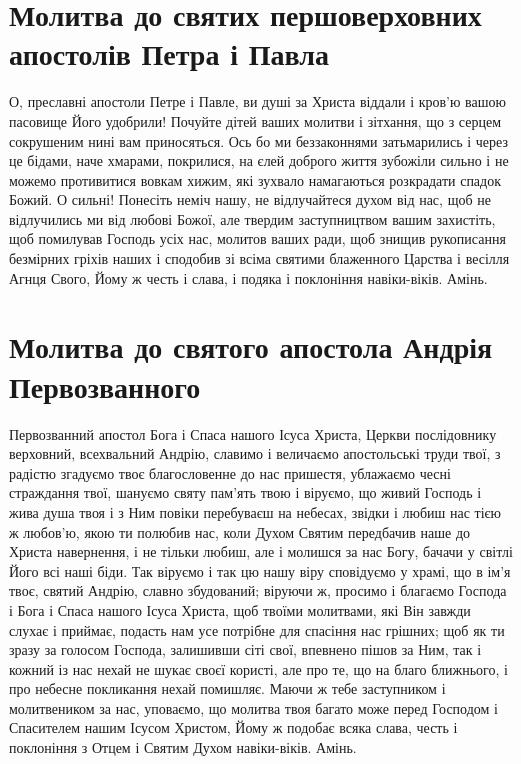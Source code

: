 \documentclass[chapters.tex]{subfiles}
\begin{document}
\section{Молитва до святих першоверховних апостолів Петра і Павла}
О, преславні апостоли Петре і Павле, ви душі за Христа віддали і кров’ю вашою пасовище Його удобрили! Почуйте дітей ваших молитви і зітхання, що з серцем сокрушеним нині вам приносяться. Ось бо ми беззаконнями затьмарились і через це бідами, наче хмарами, покрилися, на єлей доброго життя зубожіли сильно і не можемо противитися вовкам хижим, які зухвало намагаються розкрадати спадок Божий. О сильні! Понесіть неміч нашу, не відлучайтеся духом від нас, щоб не відлучились ми від любові Божої, але твердим заступництвом вашим захистіть, щоб помилував Господь усіх нас, молитов ваших ради, щоб знищив рукописання безмірних гріхів наших і сподобив зі всіма святими блаженного Царства і весілля Агнця Свого, Йому ж честь і слава, і подяка і поклоніння навіки-віків. Амінь.

\section{Молитва до святого апостола Андрія Первозванного}
Первозванний апостол Бога і Спаса нашого Ісуса Христа, Церкви послідовнику верховний, всехвальний Андрію, славимо і величаємо апостольські труди твої, з радістю згадуємо твоє благословенне до нас пришестя, ублажаємо чесні страждання твої, шануємо святу пам’ять твою і віруємо, що живий Господь і жива душа твоя і з Ним повіки перебуваєш на небесах, звідки і любиш нас тією ж любов’ю, якою ти полюбив нас, коли Духом Святим передбачив наше до Христа навернення, і не тільки любиш, але і молишся за нас Богу, бачачи у світлі Його всі наші біди. Так віруємо і так цю нашу віру сповідуємо у храмі, що в ім’я твоє, святий Андрію, славно збудований; віруючи ж, просимо і благаємо Господа і Бога і Спаса нашого Ісуса Христа, щоб твоїми молитвами, які Він завжди слухає і приймає, подасть нам усе потрібне для спасіння нас грішних; щоб як ти зразу за голосом Господа, залишивши сіті свої, впевнено пішов за Ним, так і кожний із нас нехай не шукає своєї користі, але про те, що на благо ближнього, і про небесне покликання нехай помишляє. Маючи ж тебе заступником і молитвеником за нас, уповаємо, що молитва твоя багато може перед Господом і Спасителем нашим Ісусом Христом, Йому ж подобає всяка слава, честь і поклоніння з Отцем і Святим Духом навіки-віків. Амінь.
\end{document}
